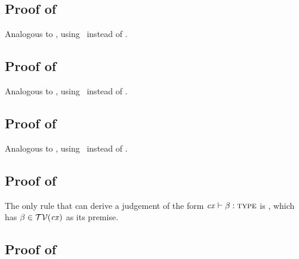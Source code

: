 \subsection*{Proof of }

Analogous to , using \Rcxax\ instead of \Rcxodec.




\subsection*{Proof of }

Analogous to , using \Rcxlem\ instead of \Rcxodec.




\subsection*{Proof of }

Analogous to , using \Rcxvdec\ instead of \Rcxodec.



\subsection*{Proof of }

The only rule that can derive a judgement of the form $\mathit{cx}\vdash\beta:\textsc{type}$ is
\Rtvar, which has $\beta\in\mathcal{TV}(\mathit{cx})$ as its premise.



\subsection*{Proof of }

